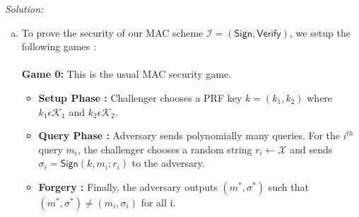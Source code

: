 \documentclass[a4paper, 11pt]{article}
\newenvironment{solution}
    {\textit{Solution:}}
    {\clearpage}
\newcommand{\sign}{\mathsf{Sign}}
\newcommand{\verif}{\mathsf{Verify}}
\newcommand{\calA}{\mathcal{A}}
\newcommand{\calI}{\mathcal{I}}
\newcommand{\calK}{\mathcal{K}}
\newcommand{\calX}{\mathcal{X}}
\begin{document}
\begin{solution}
\begin{enumerate}[(a)]
\begin{proof}
              \textbf{Case 4:} $m_i = 1$ and $\sigma_i = 0$ \\
              \textit{Possibilities:} for $a_1 = 0$, $a_2$ can only be 0 and for $a_1 = 1$, there is no possible value of $a_2$. (1 pair of $(k_1, k_2)$)\\
              So overall there are $2^n$ expected number of pairs of $k_1$ and $k_2$ satisfying our equation. \\ \\
              Now if the adversary wants to send forgery $\sigma'$ of some different message $m'$, such that $\sigma' = (k_{i1} \wedge m') \vee k_{i2}$, where $k_{i1}$ is some choice of key $k_1$ by $\calA$ and $k_{i2}$ is the corresponding key $k_2$ which satisfies $\sigma = (m \wedge k_{i1}) \vee k_{i2}$. But for different choices of $k_{i1}$, the corresponding $\sigma'$ is different. So there are $2^n$ different equally likely choices of $\sigma'$ which the adversary can send as forgery out of which only one is correct.\\
              \end{proof}
              Hence our one-query Unconditionally Secure MAC is secure even against an unbounded adversary.

        \item To prove the security of our MAC scheme $\calI = (\sign, \verif)$, we setup the following games : \\ \\
              \textbf{Game 0:} This is the usual MAC security game.
              \begin{itemize}
                  \item \textbf{Setup Phase :} Challenger chooses a PRF key $k = (k_1, k_2)$ where $k_1 \epsilon \calK_1$ and $k_2 \epsilon \calK_2$.
                  \item \textbf{Query Phase :} Adversary sends polynomially many queries. For the $i^{th}$ query $m_i$, the challenger chooses a random string $r_i \leftarrow \calX$ and sends $\sigma_i = \sign(k, m_i ; r_i)$ to the adversary.
                  \item \textbf{Forgery :} Finally, the adversary outputs $(m^*, \sigma^*)$ such that $(m^*, \sigma^*) \neq (m_i, \sigma_i)$ for all i.
              \end{itemize}


\end{enumerate}
\end{solution}
\end{document}

